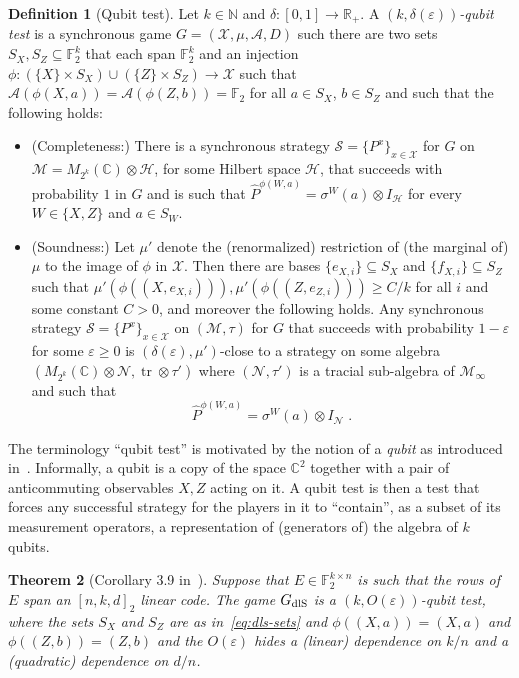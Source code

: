 \documentclass[11pt]{article}
\newtheorem{theorem}{Theorem}[section]
\theoremstyle{definition}
\newtheorem{definition}[theorem]{Definition}
\newcommand{\strategy}{\mathscr{S}}
\newcommand{\Id}{\ensuremath{I}}
\newcommand{\field}{\mathbb{F}_2}
\newcommand{\C}{\ensuremath{\mathbb{C}}}
\newcommand{\N}{\ensuremath{\mathbb{N}}}
\newcommand{\dlS}{\ensuremath{\rm dlS}}
\newcommand{\F}{\ensuremath{\mathbb{F}}}
\newcommand{\R}{\ensuremath{\mathbb{R}}}
\newcommand{\mA}{\ensuremath{\mathcal{A}}}
\newcommand{\mH}{\ensuremath{\mathcal{H}}}
\newcommand{\mM}{\ensuremath{\mathcal{M}}}
\newcommand{\mX}{\ensuremath{\mathcal{X}}}
\newcommand{\eps}{\varepsilon}
\newcommand{\mN}{\mathcal{N}}
\DeclareMathOperator{\tr}{tr}
\begin{document}
\begin{definition}[Qubit test]
Let $k\in \N$ and $\delta:[0,1]\to\R_+$. 
A \emph{$(k,\delta(\eps))$-qubit test} is a synchronous game $G=(\mX,\mu,\mA,D)$ such there are two sets $S_X,S_Z\subseteq \field^k$ that each span $\field^k$ and an injection $\phi:(\{X\}\times S_X) \cup (\{Z\}\times S_Z) \to \mX$ such that $\mA(\phi({X},a))=\mA(\phi({Z},b))=\field$ for all $a\in S_X$, $b\in S_Z$ and such that the following holds:
\begin{itemize}
\item (Completeness:) There is a synchronous strategy $\strategy = \{P^{x}\}_{x \in \mX}$ for $G$ on $\mM=M_{2^{k}}(\C)\otimes \mH$, for some Hilbert space $\mH$, that succeeds with probability $1$ in $G$ and is such that $\widehat{P}^{\phi({W},a)} = \sigma^W(a)\otimes \Id_\mH$ for every $W\in\{X,Z\}$ and $a\in S_W$. 
\item (Soundness:) Let $\mu'$ denote the (renormalized) restriction of (the marginal of) $\mu$ to the image of $\phi$ in $\mX$. Then there are bases $\{e_{X,i}\}\subseteq S_X$ and $\{f_{X,i}\}\subseteq{S_Z}$ such that $\mu'(\phi((X,e_{X,i}))),\mu'(\phi((Z,e_{Z,i})))\geq C/k$ for all $i$ and some constant $C>0$, and moreover the following holds. 
Any synchronous strategy  $\strategy = \{P^{x}\}_{x \in \mX}$ on $(\mM,\tau)$ for $G$ that succeeds with probability $1-\eps$ for some $\eps\geq 0$ is $(\delta(\eps),\mu')$-close to a strategy on some algebra $(M_{2^{k}}(\C)\otimes \mN,\tr\otimes \tau')$ where $(\mN,\tau')$ is a tracial sub-algebra of $\mM_\infty$ and such that
\[\widehat{P}^{\phi({W},a)} = \sigma^W(a)\otimes \Id_\mN\;.\]
\end{itemize}
\end{definition}

The terminology ``qubit test'' is motivated by the notion of a \emph{qubit} as introduced in~\cite{chao2017overlapping}. Informally, a qubit is a copy of the space $\C^2$ together with a pair of anticommuting observables $X,Z$ acting on it. A qubit test is then a test that forces any successful strategy for the players in it to ``contain'', as a subset of its measurement operators, a representation of (generators of) the algebra of $k$ qubits. 

\begin{theorem}[Corollary 3.9 in~\cite{de2022spectral}]\label{thm:dls-braid}
Suppose that $E\in \F_2^{k\times n}$ is such that the rows of $E$ span an $[n,k,d]_2$ linear code. The game $G_{\dlS}$ is a $(k,O(\eps))$-qubit test, where the sets $S_X$ and $S_Z$ are as in~\eqref{eq:dls-sets} and $\phi((X,a))=(X,a)$ and $\phi((Z,b))=(Z,b)$ and the $O(\eps)$ hides a (linear) dependence on $k/n$ and a (quadratic) dependence on $d/n$.  
\end{theorem}
\end{document}
